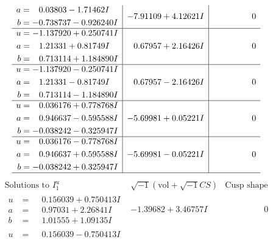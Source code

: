\documentclass[1p]{elsarticle_modified}
\theoremstyle{definition}
\newcommand{\I}{\sqrt{-1}}
\begin{document}
$$\begin{array}{c|c|c}
\begin{aligned}
a &= \phantom{-}0.03803 - 1.71462 I \\
b &= -0.738737 - 0.926240 I\end{aligned}
 & -7.91109 + 4.12621 I & \phantom{-0.000000 } 0 \\ \hline\begin{aligned}
u &= -1.137920 + 0.250741 I \\
a &= \phantom{-}1.21331 + 0.81749 I \\
b &= \phantom{-}0.713114 + 1.184890 I\end{aligned}
 & \phantom{-}0.67957 + 2.16426 I & \phantom{-0.000000 } 0 \\ \hline\begin{aligned}
u &= -1.137920 - 0.250741 I \\
a &= \phantom{-}1.21331 - 0.81749 I \\
b &= \phantom{-}0.713114 - 1.184890 I\end{aligned}
 & \phantom{-}0.67957 - 2.16426 I & \phantom{-0.000000 } 0 \\ \hline\begin{aligned}
u &= \phantom{-}0.036176 + 0.778768 I \\
a &= \phantom{-}0.946637 - 0.595588 I \\
b &= -0.038242 - 0.325947 I\end{aligned}
 & -5.69981 + 0.05221 I & \phantom{-0.000000 } 0 \\ \hline\begin{aligned}
u &= \phantom{-}0.036176 - 0.778768 I \\
a &= \phantom{-}0.946637 + 0.595588 I \\
b &= -0.038242 + 0.325947 I\end{aligned}
 & -5.69981 - 0.05221 I & \phantom{-0.000000 } 0\\
 \hline 
 \end{array}$$\newpage$$\begin{array}{c|c|c}  
\text{Solutions to }I^u_{1}& \I (\text{vol} + \sqrt{-1}CS) & \text{Cusp shape}\\
 \hline 
\begin{aligned}
u &= \phantom{-}0.156039 + 0.750413 I \\
a &= \phantom{-}0.97031 + 2.26841 I \\
b &= \phantom{-}1.01555 + 1.09135 I\end{aligned}
 & -1.39682 + 3.46757 I & \phantom{-0.000000 } 0 \\ \hline\begin{aligned}
u &= \phantom{-}0.156039 - 0.750413 I \\

\end{aligned}
\end{array}$$
\end{document}
